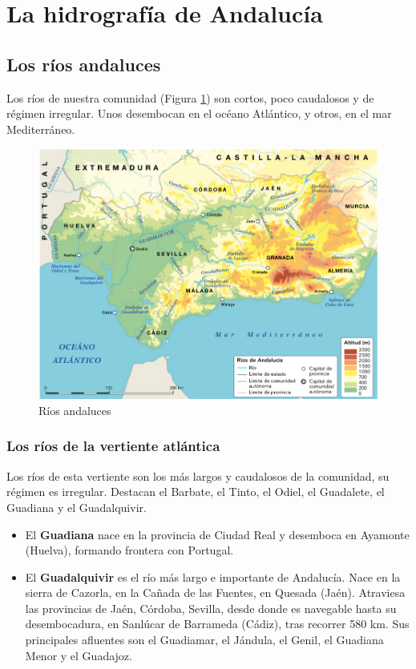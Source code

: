 \section{La hidrografía de Andalucía}

\subsection{Los ríos andaluces}

Los ríos de nuestra comunidad (Figura \ref{fig:rios-andaluces}) son cortos, poco caudalosos y de régimen irregular. Unos desembocan en el océano Atlántico, y otros, en el mar Mediterráneo.

\begin{figure}[!ht]
    \centering
    \includegraphics[width=1\linewidth]{Tema2/09_Rios_andaluces.png}
    \caption{Ríos andaluces}
    \label{fig:rios-andaluces}
\end{figure}

\subsubsection{Los ríos de la vertiente atlántica}

Los ríos de esta vertiente son los más largos y caudalosos de la comunidad, su régimen es irregular. Destacan el Barbate, el Tinto, el Odiel, el Guadalete, el Guadiana y el Guadalquivir.

\begin{itemize}
    \item El \textbf{Guadiana} nace en la provincia de Ciudad Real y desemboca en Ayamonte (Huelva), formando frontera con Portugal.
    \item El \textbf{Guadalquivir} es el río más largo e importante de Andalucía. Nace en la sierra de Cazorla, en la Cañada de las Fuentes, en Quesada (Jaén). Atraviesa las provincias de Jaén, Córdoba, Sevilla, desde donde es navegable hasta su desembocadura, en Sanlúcar de Barrameda (Cádiz), tras recorrer 580 km. Sus principales afluentes son el Guadiamar, el Jándula, el Genil, el Guadiana Menor y el Guadajoz.
\end{itemize}

